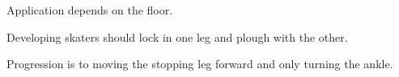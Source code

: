 Application depends on the floor.

Developing skaters should lock in one leg and plough with the other. 

Progression is to moving the stopping leg forward and only turning the ankle. 
